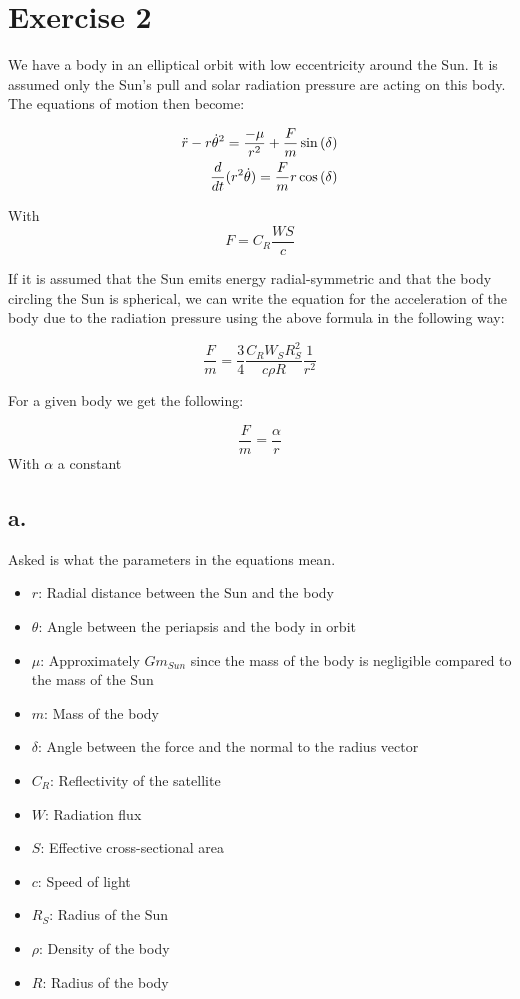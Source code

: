\section{Exercise 2}
We have a body in an elliptical orbit with low eccentricity around the Sun. It is assumed only the Sun's pull and solar radiation pressure are acting on this body. The equations of motion then become:

\begin{equation} \label{eq:2StartingEq}
    \begin{split}
        \Ddot{r} - r \dot{\theta}^2 = \frac{-\mu}{r^2} + \frac{F}{m} \sin{(\delta)} \\
        \frac{d}{dt}(r^2 \dot{\theta}) = \frac{F}{m} r \cos{(\delta)}
    \end{split}
\end{equation}

With
\begin{equation}
    F = C_R \frac{W S}{c}
\end{equation}

If it is assumed that the Sun emits energy radial-symmetric and that the body circling the Sun is spherical, we can write the equation for the acceleration of the body due to the radiation pressure using the above formula in the following way:

\begin{equation} \label{eq:2aFm}
    \frac{F}{m} = \frac{3}{4} \frac{C_R W_S R_S^2}{c \rho R} \frac{1}{r^2}
\end{equation}

For a given body we get the following:

\begin{equation}
    \frac{F}{m} = \frac{\alpha}{r}    
\end{equation}
With $\alpha$ a constant

\subsection*{a.}
Asked is what the parameters in the equations mean.
\begin{itemize}
    \item $r$: Radial distance between the Sun and the body
    \item $\theta$: Angle between the periapsis and the body in orbit
    \item $\mu$: Approximately $G m_{Sun}$ since the mass of the body is negligible compared to the mass of the Sun
    \item $m$: Mass of the body
    \item $\delta$: Angle between the force and the normal to the radius vector
    \item $C_R$: Reflectivity of the satellite
    \item $W$: Radiation flux
    \item $S$: Effective cross-sectional area
    \item $c$: Speed of light
    \item $R_S$: Radius of the Sun
    \item $\rho$: Density of the body
    \item $R$: Radius of the body
\end{itemize}

